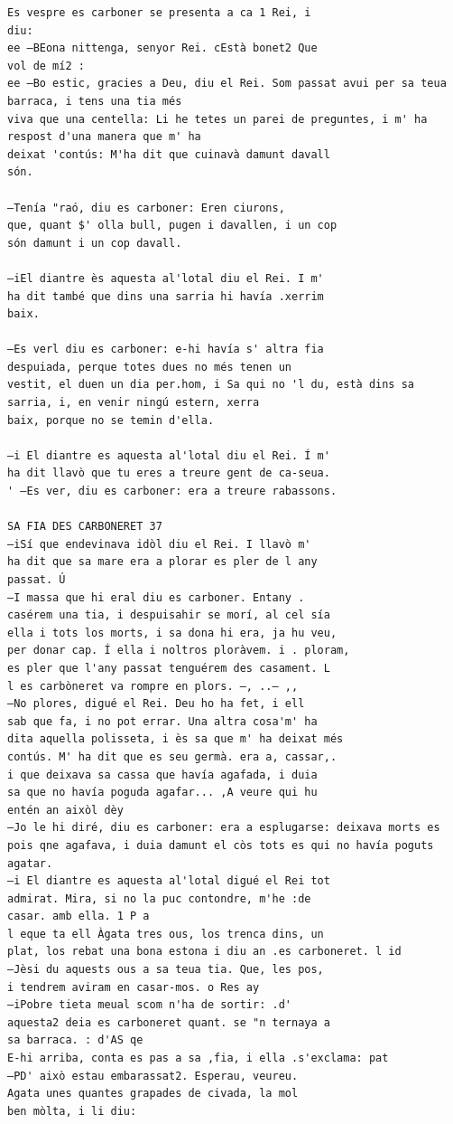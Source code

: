 \documentclass[
  letterpaper,
  DIV=11,
  numbers=noendperiod]{scrreprt}
\begin{document}
\begin{verbatim}
Es vespre es carboner se presenta a ca 1 Rei, i
diu:
ee —BEona nittenga, senyor Rei. cEstà bonet2 Que
vol de mí2 :
ee —Bo estic, gracies a Deu, diu el Rei. Som passat avui per sa teua barraca, i tens una tia més
viva que una centella: Li he tetes un parei de preguntes, i m' ha respost d'una manera que m' ha
deixat 'contús: M'ha dit que cuinavà damunt davall
són.

—Tenía "raó, diu es carboner: Eren ciurons,
que, quant $' olla bull, pugen i davallen, i un cop
són damunt i un cop davall.

—iEl diantre ès aquesta al'lotal diu el Rei. I m'
ha dit també que dins una sarria hi havía .xerrim
baix.

—Es verl diu es carboner: e-hi havía s' altra fia
despuiada, perque totes dues no més tenen un
vestit, el duen un dia per.hom, i Sa qui no 'l du, està dins sa sarria, i, en venir ningú estern, xerra
baix, porque no se temin d'ella.

—i El diantre es aquesta al'lotal diu el Rei. Í m'
ha dit llavò que tu eres a treure gent de ca-seua.
' —Es ver, diu es carboner: era a treure rabassons.

SA FIA DES CARBONERET 37
—iSí que endevinava idòl diu el Rei. I llavò m'
ha dit que sa mare era a plorar es pler de l any
passat. Ú
—I massa que hi eral diu es carboner. Entany .
casérem una tia, i despuisahir se morí, al cel sía
ella i tots los morts, i sa dona hi era, ja hu veu,
per donar cap. Í ella i noltros ploràvem. i . ploram,
es pler que l'any passat tenguérem des casament. L
l es carbòneret va rompre en plors. —, ..— ,,
—No plores, digué el Rei. Deu ho ha fet, i ell
sab que fa, i no pot errar. Una altra cosa'm' ha
dita aquella polisseta, i ès sa que m' ha deixat més
contús. M' ha dit que es seu germà. era a, cassar,.
i que deixava sa cassa que havía agafada, i duia
sa que no havía poguda agafar... ,A veure qui hu
entén an aixòl dèy
—Jo le hi diré, diu es carboner: era a esplugarse: deixava morts es pois qne agafava, i duia damunt el còs tots es qui no havía poguts agatar.
—i El diantre es aquesta al'lotal digué el Rei tot
admirat. Mira, si no la puc contondre, m'he :de
casar. amb ella. 1 P a
l eque ta ell Àgata tres ous, los trenca dins, un
plat, los rebat una bona estona i diu an .es carboneret. l id
—Jèsi du aquests ous a sa teua tia. Que, les pos,
i tendrem aviram en casar-mos. o Res ay
—iPobre tieta meual scom n'ha de sortir: .d'
aquesta2 deia es carboneret quant. se "n ternaya a
sa barraca. : d'AS qe
E-hi arriba, conta es pas a sa ,fia, i ella .s'exclama: pat
—PD' això estau embarassat2. Esperau, veureu.
Agata unes quantes grapades de civada, la mol
ben mòlta, i li diu:


\end{verbatim}
\end{document}
